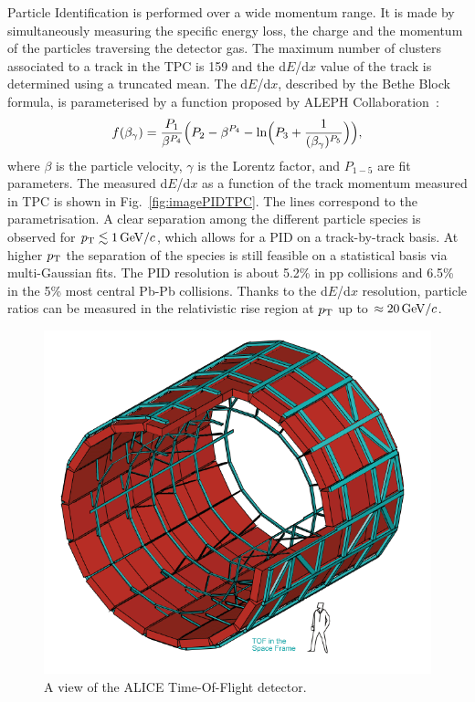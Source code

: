 Particle Identification is performed over a wide momentum range. It is made by 
simultaneously measuring the specific energy loss, the charge and the momentum of the 
particles traversing the detector gas. The maximum number of clusters associated to a track in the TPC 
is 159 and the d$E$/d$x$ value of the track is determined using a truncated mean.
The d$E$/d$x$, described by the Bethe Block formula,
is parameterised by a function proposed by ALEPH Collaboration~\cite{Rolandi:2008qla}:
\begin{equation}
f(\beta_\gamma) = \frac{P_1}{\beta^{P_4}} \Big ( P_2 - \beta^{P_4} - {\rm ln}\Big (   P_3 + \frac{1}{(\beta_\gamma)^{P_5}} \Big )   \Big ),
\end{equation}
where $\beta$ is the particle velocity, $\gamma$ is the Lorentz factor, and $P_{1-5}$ are fit parameters. 
The measured d$E$/d$x$ as a function of the track momentum measured in TPC is
shown in Fig.~\ref{fig:imagePIDTPC}. The lines correspond to the parametrisation. 
A clear separation among the different particle species
is observed for $p_{\rm T} \lesssim 1 \, \mathrm{GeV}/c$, which allows for a PID on a track-by-track basis. At higher $p_{\rm T}$ the separation of the species is still feasible 
on a statistical basis via multi-Gaussian fits. The PID resolution is about 5.2\% in 
pp collisions and 6.5\% in the 5\% most central Pb-Pb collisions. Thanks to the d$E$/d$x$ resolution, 
particle ratios can be measured in the relativistic rise region at $p_{\rm T}$ up to $\approx 20\, \mathrm{GeV}/c$.
 \begin{figure}[!h]
\centering
\includegraphics[width=.5\textwidth]{FigCap3/TOFCylinder.png}
\caption{A view of the ALICE Time-Of-Flight detector.}
\label{fig:imageTOF}
\end{figure}

